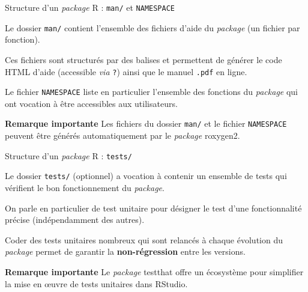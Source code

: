 \documentclass[12pt,handout,ignorenonframetext,]{beamer}
\newcommand{\intertitre}[1]{\textbf{\textcolor{redInsee}{#1}}}
\begin{document}
\begin{frame}[fragile]{\large Structure d'un \emph{package} R :
\texttt{man/} et \texttt{NAMESPACE}}

Le dossier \texttt{man/} contient l'ensemble des fichiers d'aide du
\emph{package} (un fichier par fonction).

\bigskip \pause Ces fichiers sont structurés par des balises et
permettent de générer le code HTML d'aide (accessible \emph{via}
\texttt{?}) ainsi que le manuel \texttt{.pdf} en ligne.

\pause \bigskip Le fichier \texttt{NAMESPACE} liste en particulier
l'ensemble des fonctions du \emph{package} qui ont vocation à être
accessibles aux utilisateurs.

\pause \intertitre{Remarque importante} Les fichiers du dossier
\texttt{man/} et le fichier \texttt{NAMESPACE} peuvent être générés
automatiquement par le \emph{package} roxygen2.

\end{frame}

\begin{frame}[fragile]{Structure d'un \emph{package} R :
\texttt{tests/}}

Le dossier \texttt{tests/} (optionnel) a vocation à contenir un ensemble
de tests qui vérifient le bon fonctionnement du \emph{package}.

\bigskip \pause On parle en particulier de \og test unitaire \fg{} pour
désigner le test d'une fonctionnalité précise (indépendamment des
autres).

\bigskip \pause Coder des tests unitaires nombreux qui sont relancés à
chaque évolution du \emph{package} permet de garantir la
\textbf{non-régression} entre les versions.

\bigskip \pause \intertitre{Remarque importante} Le \emph{package}
testthat offre un écosystème pour simplifier la mise en \oe uvre de
tests unitaires dans RStudio.

\end{frame}
\end{document}
